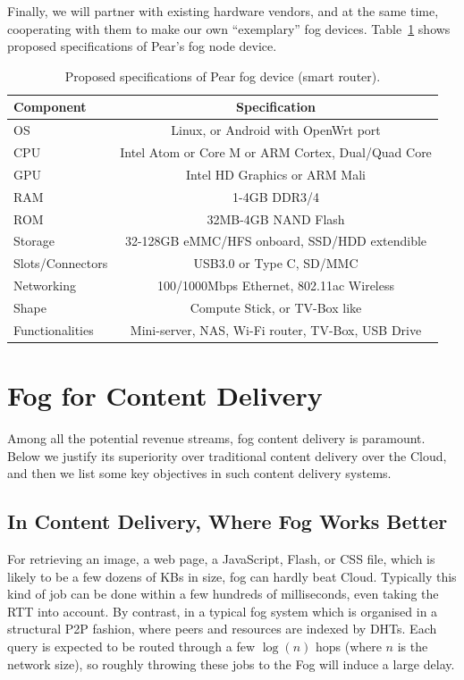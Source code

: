 Finally, we will partner with existing hardware vendors, and at the same time, cooperating with them to make our own ``exemplary'' fog devices. Table~\ref{tb:pear-device-spec} shows proposed specifications of Pear's fog node device. 
\begin{table}[htb]
	\small
	\centering
	\caption{Proposed specifications of Pear fog device (smart router).}\label{tb:pear-device-spec}
	\begin{tabular}{lc}
		\toprule
		Component & Specification\\
		\midrule 
		OS  & Linux, or Android with OpenWrt port\\
		CPU & Intel Atom or Core M or ARM Cortex, Dual/Quad Core\\
		GPU & Intel HD Graphics or ARM Mali\\
		RAM & 1-4GB DDR3/4\\
		ROM & 32MB-4GB NAND Flash\\
		Storage & 32-128GB eMMC/HFS onboard, SSD/HDD extendible\\
		Slots/Connectors & USB3.0 or Type C, SD/MMC\\
		Networking & 100/1000Mbps Ethernet, 802.11ac Wireless\\
		Shape & Compute Stick, or TV-Box like\\
		Functionalities & Mini-server, NAS, Wi-Fi router, TV-Box, USB Drive\\
		\bottomrule
	\end{tabular}
\end{table}

\section{Fog for Content Delivery}
Among all the potential revenue streams, fog content delivery is paramount. Below we justify its superiority over traditional content delivery over the Cloud, and then we list some key objectives in such content delivery systems. 
\subsection{In Content Delivery, Where Fog Works Better}  %

For retrieving an image, a web page, a JavaScript, Flash, or CSS file, which is likely to be a few dozens of KBs in size, fog can hardly beat Cloud. Typically this kind of job can be done within a few hundreds of milliseconds, even taking the RTT into account. By contrast, in a typical fog system which is organised in a structural P2P fashion, where peers and resources are indexed by DHTs. Each query is expected to be routed through a few $\log(n)$ hops (where $n$ is the network size), so roughly throwing these jobs to the Fog will induce a large delay. 

